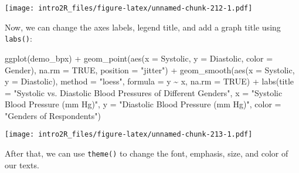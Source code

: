 \documentclass[
]{book}
\newenvironment{Shaded}{\begin{snugshade}}{\end{snugshade}}
\newcommand{\AttributeTok}[1]{\textcolor[rgb]{0.77,0.63,0.00}{#1}}
\newcommand{\ConstantTok}[1]{\textcolor[rgb]{0.00,0.00,0.00}{#1}}
\newcommand{\FunctionTok}[1]{\textcolor[rgb]{0.00,0.00,0.00}{#1}}
\newcommand{\NormalTok}[1]{#1}
\newcommand{\SpecialCharTok}[1]{\textcolor[rgb]{0.00,0.00,0.00}{#1}}
\newcommand{\StringTok}[1]{\textcolor[rgb]{0.31,0.60,0.02}{#1}}
\begin{document}
\texttt{[image: intro2R\_files/figure-latex/unnamed-chunk-212-1.pdf]}

Now, we can change the axes labels, legend title, and add a graph title using \texttt{labs()}:

\begin{Shaded}
\begin{Highlighting}[]
\FunctionTok{ggplot}\NormalTok{(demo\_bpx) }\SpecialCharTok{+}
    \FunctionTok{geom\_point}\NormalTok{(}\FunctionTok{aes}\NormalTok{(}\AttributeTok{x =}\NormalTok{ Systolic, }\AttributeTok{y =}\NormalTok{ Diastolic, }\AttributeTok{color =}\NormalTok{ Gender), }
             \AttributeTok{na.rm =} \ConstantTok{TRUE}\NormalTok{,}
             \AttributeTok{position =} \StringTok{"jitter"}\NormalTok{) }\SpecialCharTok{+}
    \FunctionTok{geom\_smooth}\NormalTok{(}\FunctionTok{aes}\NormalTok{(}\AttributeTok{x =}\NormalTok{ Systolic, }\AttributeTok{y =}\NormalTok{ Diastolic), }
                \AttributeTok{method =} \StringTok{"loess"}\NormalTok{,}
                \AttributeTok{formula =}\NormalTok{ y }\SpecialCharTok{\textasciitilde{}}\NormalTok{ x,}
                \AttributeTok{na.rm =} \ConstantTok{TRUE}\NormalTok{) }\SpecialCharTok{+} 
    \FunctionTok{labs}\NormalTok{(}\AttributeTok{title =} \StringTok{"Systolic vs. Diastolic Blood Pressures of Different Genders"}\NormalTok{,}
         \AttributeTok{x =} \StringTok{"Systolic Blood Pressure (mm Hg)"}\NormalTok{, }
         \AttributeTok{y =} \StringTok{"Diastolic Blood Pressure (mm Hg)"}\NormalTok{,}
         \AttributeTok{color =} \StringTok{"Genders of Respondents"}\NormalTok{)}
\end{Highlighting}
\end{Shaded}

\texttt{[image: intro2R\_files/figure-latex/unnamed-chunk-213-1.pdf]}

After that, we can use \texttt{theme()} to change the font, emphasis, size, and color of our texts.
\end{document}
